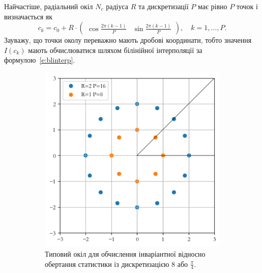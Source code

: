 Найчастіше, радіальний окіл $N_c$ радіуса $R$ та дискретизації $P$ має рівно $P$ точок і визначається як
\begin{equation}\label{e:circle}
    c_k = c_0 + R \cdot \begin{pmatrix} \cos \frac{2\pi (k-1)}{P} & \sin \frac{2\pi (k-1)}{P} \end{pmatrix}, \quad k=1,\dots,P.
\end{equation}
Зауважу, що точки околу переважно мають дробові координати, тобто значення $I(c_k)$ мають обчислюватися шляхом білінійної інтерполяції за формулою~\eqref{e:blinterp}.

\begin{figure}[h]
    \begin{subfigure}{0.48\textwidth}
    \includegraphics[width=0.9\linewidth]{img/clique-2.png} 
    \caption{
        Типовий окіл для обчислення інваріантної відносно обертання статистики із дискретизацією 8 або $\frac{\pi}{4}$. 
    }
    \label{subfig:clique-2a}
    \end{subfigure}%
    \hfill
    \begin{subfigure}{0.48\textwidth}

\end{subfigure}
\end{figure}
